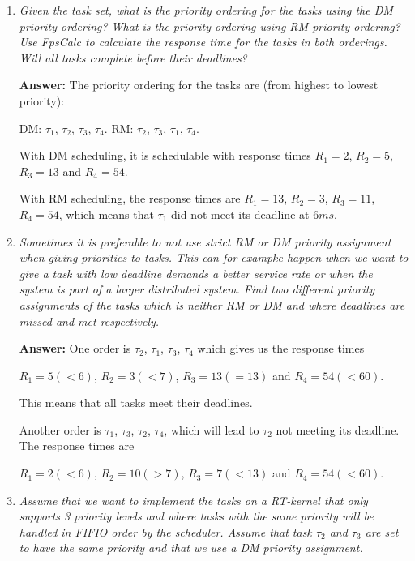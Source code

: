 \documentclass[a4paper,10pt]{article}
\newcommand{\answer}{\textbf{Answer: }}
\begin{document}
\begin{enumerate}
	\item \emph{Given the task set, what is the priority ordering for the tasks using the DM priority ordering? What is the priority ordering using RM priority ordering? Use FpsCalc to calculate the response time for the tasks in both orderings. Will all tasks complete before their deadlines?}
	
	\answer The priority ordering for the tasks are (from highest to lowest priority):
	
	DM: $\tau_1$, $\tau_2$, $\tau_3$, $\tau_4$.
	RM: $\tau_2$, $\tau_3$, $\tau_1$, $\tau_4$.
	
	With DM scheduling, it is schedulable with response times $R_1 = 2$, $R_2 = 5$, $R_3 = 13$ and $R_4 = 54$.
	
	With RM scheduling, the response times are $R_1 = 13$, $R_2 = 3$, $R_3 = 11$, $R_4 = 54$, which means that $\tau_1$ did not meet its deadline at $6ms$.
	
	
	\item \emph{Sometimes it is preferable to not use strict RM or DM priority assignment when giving priorities to tasks. This can for exampke happen when we want to give a task with low deadline demands a better service rate or when the system is part of a larger distributed system. Find two different priority assignments of the tasks which is neither RM or DM and where deadlines are missed and met respectively.}
	
	\answer One order is $\tau_2$, $\tau_1$, $\tau_3$, $\tau_4$ which gives us the response times 
	
	$R_1 = 5 (< 6)$, $R_2 = 3 (< 7)$, $R_3 = 13 (= 13)$ and $R_4 = 54 (< 60)$. 
	
	This means that all tasks meet their deadlines.
	
	Another order is $\tau_1$, $\tau_3$, $\tau_2$, $\tau_4$, which will lead to $\tau_2$ not meeting its deadline. The response times are
	
	$R_1 = 2 (< 6)$, $R_2 = 10 (> 7)$, $R_3 = 7 (< 13)$ and $R_4 = 54 (< 60)$.
	
	
	\item \emph{Assume that we want to implement the tasks on a RT-kernel that only supports 3 priority levels and where tasks with the same priority will be handled in FIFIO order by the scheduler. Assume that task $\tau_2$ and $\tau_3$ are set to have the same priority and that we use a DM priority assignment.}
	

\end{enumerate}
\end{document}
